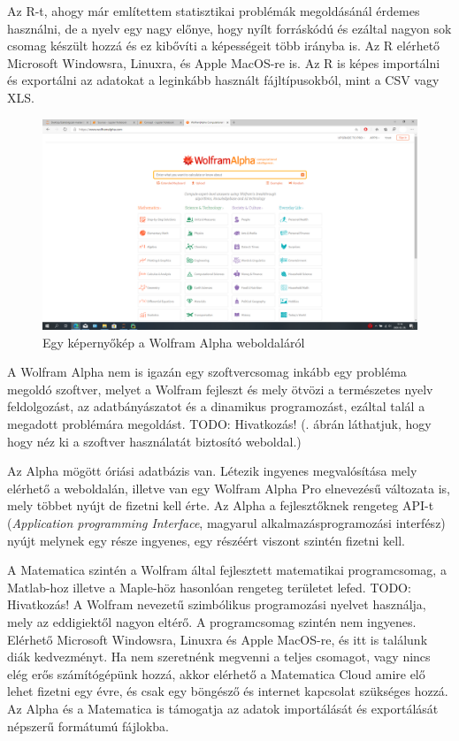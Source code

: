 Az R-t, ahogy már
említettem statisztikai problémák megoldásánál érdemes használni, de a
nyelv egy nagy előnye, hogy nyílt forráskódú és ezáltal nagyon sok
csomag készült hozzá és ez kibővíti a képességeit több irányba is. Az R
elérhető Microsoft Windowsra, Linuxra, és Apple MacOS-re is. Az R is
képes importálni és exportálni az adatokat a leginkább használt
fájltípusokból, mint a CSV vagy XLS.


\begin{figure}
\centering
\includegraphics[width=\textwidth]{img/alpha_screen.png}
\caption{Egy képernyőkép a Wolfram Alpha weboldaláról}
\label{fig:wolfram-alpha}
\end{figure}

A Wolfram Alpha nem is igazán egy szoftvercsomag inkább egy probléma
megoldó szoftver, melyet a Wolfram fejleszt és mely ötvözi a természetes
nyelv feldolgozást, az adatbányászatot és a dinamikus programozást,
ezáltal talál a megadott problémára megoldást.
TODO: Hivatkozás! %
(. ábrán láthatjuk, hogy hogy néz ki a szoftver használatát biztosító weboldal.)

Az Alpha mögött óriási
adatbázis van. Létezik ingyenes megvalósítása mely elérhető a
weboldalán, illetve van egy Wolfram Alpha Pro elnevezésű változata is,
mely többet nyújt de fizetni kell érte. Az Alpha a fejlesztőknek
rengeteg API-t (\emph{Application programming Interface}, magyarul
alkalmazásprogramozási interfész) nyújt melynek egy része ingyenes, egy
részéért viszont szintén fizetni kell.

A Matematica szintén a Wolfram által fejlesztett matematikai
programcsomag, a Matlab-hoz illetve a Maple-höz hasonlóan rengeteg
területet lefed.
TODO: Hivatkozás! %
A Wolfram nevezetű szimbólikus programozási nyelvet
használja, mely az eddigiektől nagyon eltérő. A programcsomag szintén
nem ingyenes. Elérhető Microsoft Windowsra, Linuxra és Apple MacOS-re,
és itt is találunk diák kedvezményt. Ha nem szeretnénk megvenni a teljes
csomagot, vagy nincs elég erős számítógépünk hozzá, akkor elérhető a
Matematica Cloud amire elő lehet fizetni egy évre, és csak egy böngésző
és internet kapcsolat szükséges hozzá. Az Alpha és a Matematica is
támogatja az adatok importálását és exportálását népszerű formátumú
fájlokba.

